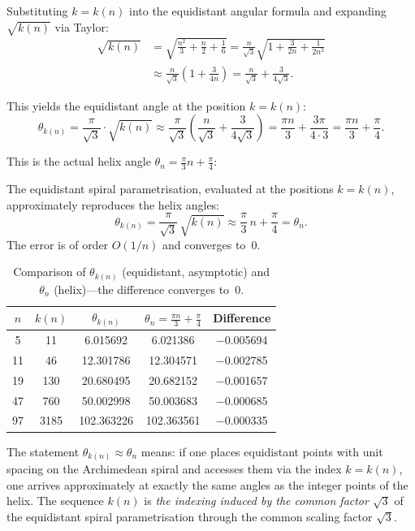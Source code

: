 Substituting $k = k(n)$ into the equidistant angular formula and
expanding $\sqrt{k(n)}$ via Taylor:
\begin{align*}
  \sqrt{k(n)}
  &= \sqrt{\frac{n^2}{3} + \frac{n}{2} + \frac{1}{6}}
   = \frac{n}{\sqrt{3}}\sqrt{1 + \frac{3}{2n} + \frac{1}{2n^2}} \\
  &\approx \frac{n}{\sqrt{3}}\!\left(1 + \frac{3}{4n}\right)
   = \frac{n}{\sqrt{3}} + \frac{3}{4\sqrt{3}}.
\end{align*}

This yields the equidistant angle at the position $k = k(n)$:
\[
  \theta_{k(n)}
  = \frac{\pi}{\sqrt{3}}\cdot\sqrt{k(n)}
  \approx \frac{\pi}{\sqrt{3}}\!\left(\frac{n}{\sqrt{3}} + \frac{3}{4\sqrt{3}}\right)
  = \frac{\pi n}{3} + \frac{3\pi}{4 \cdot 3}
  = \frac{\pi n}{3} + \frac{\pi}{4}.
\]

This is the actual helix angle $\theta_n = \tfrac{\pi}{3}n + \tfrac{\pi}{4}$:

\begin{satz}\label{satz:sqrt3}
The equidistant spiral parametrisation, evaluated at the
positions $k = k(n)$, approximately reproduces the helix angles:
\[
  \theta_{k(n)}
  = \frac{\pi}{\sqrt{3}}\,\sqrt{k(n)}
  \approx \frac{\pi}{3}\,n + \frac{\pi}{4}
  = \theta_n.
\]
The error is of order $O(1/n)$ and converges to~$0$.
\end{satz}

\begin{table}[H]
\centering
\renewcommand{\arraystretch}{1.2}
\caption{Comparison of $\theta_{k(n)}$ (equidistant, asymptotic) and $\theta_n$ (helix)---the difference converges to~$0$.}
\begin{tabular}{ccccc}
\toprule
$n$ & $k(n)$ & $\theta_{k(n)}$ & $\theta_n = \frac{\pi n}{3}+\frac{\pi}{4}$ & Difference \\
\midrule
 5  &  11  &  6.015692 &  6.021386 & $-$0.005694 \\
11  &  46  & 12.301786 & 12.304571 & $-$0.002785 \\
19  & 130  & 20.680495 & 20.682152 & $-$0.001657 \\
47  & 760  & 50.002998 & 50.003683 & $-$0.000685 \\
97  & 3185 & 102.363226 & 102.363561 & $-$0.000335 \\
\bottomrule
\end{tabular}
\end{table}

\begin{bemerkung}
The statement $\theta_{k(n)} \approx \theta_n$ means: if one places
equidistant points with unit spacing on the Archimedean spiral
and accesses them via the index $k = k(n)$, one arrives approximately
at exactly the same angles as the integer points of the helix.
The sequence $k(n)$ is \emph{the indexing induced by the common factor $\sqrt{3}$}
of the equidistant spiral parametrisation through the common
scaling factor $\sqrt{3}$.
\end{bemerkung}

